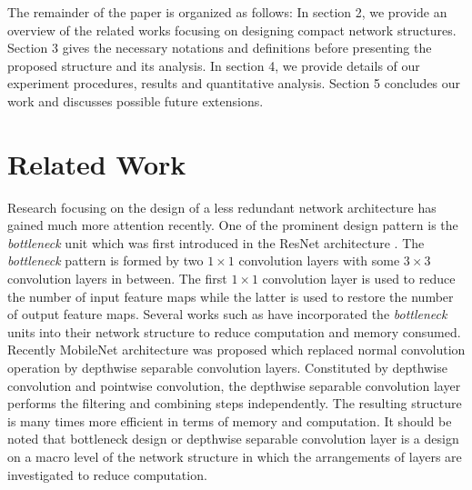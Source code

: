 \documentclass[conference,usletter]{IEEEtran}
\begin{document}
The remainder of the paper is organized as follows: In section 2, we provide an overview of the related works focusing on designing compact network structures. Section 3 gives the necessary notations and definitions before presenting the proposed structure and its analysis. In section 4, we provide details of our experiment procedures, results and quantitative analysis. Section 5 concludes our work and discusses possible future extensions.


\section{Related Work}
Research focusing on the design of a less redundant network architecture has gained much more attention recently. One of the prominent design pattern is the \textit{bottleneck} unit which was first introduced in the ResNet architecture \cite{he2016deep}. The \textit{bottleneck} pattern is formed by two $1\times1$ convolution layers with some $3\times3$ convolution layers in between. The first $1\times1$ convolution layer is used to reduce the number of input feature maps while the latter is used to restore the number of output feature maps. Several works such as \cite{zhang2017shufflenet,wangdesign,szegedy2017inception} have incorporated the \textit{bottleneck} units into their network structure to reduce computation and memory consumed. Recently MobileNet architecture \cite{howard2017mobilenets} was proposed which replaced normal convolution operation by depthwise separable convolution layers. Constituted by depthwise convolution and pointwise convolution, the depthwise separable convolution layer performs the filtering and combining steps independently. The resulting structure is many times more efficient in terms of memory and computation. It should be noted that bottleneck design or depthwise separable convolution layer is a design on a macro level of the network structure in which the arrangements of layers are investigated to reduce computation.
\end{document}
